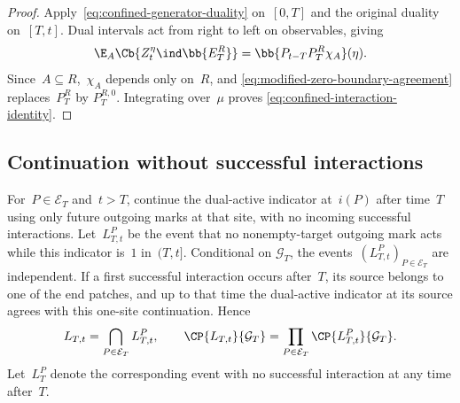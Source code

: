 \begin{proof}
Apply~\eqref{eq:confined-generator-duality} on~$[0,T]$ and the original duality
on~$[T,t]$. Dual intervals act from right to left on observables, giving
\begin{equation*}
\E_A\Cb{Z_t^\eta\ind\bb{E_T^R}}
=
\bb{P_{t-T}P_T^R\chi_A}(\eta).
\end{equation*}
Since~$A\subseteq R$,~$\chi_A$ depends only on~$R$, and
\eqref{eq:modified-zero-boundary-agreement} replaces~$P_T^R$ by
$P_T^{R,0}$. Integrating over~$\mu$ proves
\eqref{eq:confined-interaction-identity}.
\end{proof}

\subsection{Continuation without successful interactions}
\label{app:no-late-continuation}

For~$P\in\mathcal E_T$ and~$t>T$, continue the dual-active indicator at~$i(P)$
after time~$T$ using only future outgoing marks at that site, with no incoming
successful interactions. Let~$L_{T,t}^P$ be the event that no nonempty-target
outgoing mark acts while this indicator is~$1$ in~$(T,t]$. Conditional on
$\mathcal G_T$, the events~$(L_{T,t}^P)_{P\in\mathcal E_T}$ are independent.
If a first successful interaction occurs after~$T$, its source belongs to one
of the end patches, and up to that time the dual-active indicator at its source
agrees with this one-site continuation. Hence
\begin{equation}
\label{eq:local-no-late-factorization}
L_{T,t}
=
\bigcap_{P\in\mathcal E_T}L_{T,t}^P,
\qquad
\CP{L_{T,t}}{\mathcal G_T}
=
\prod_{P\in\mathcal E_T}\CP{L_{T,t}^P}{\mathcal G_T}.
\end{equation}
Let~$L_T^P$ denote the corresponding event with no successful interaction at
any time after~$T$.

